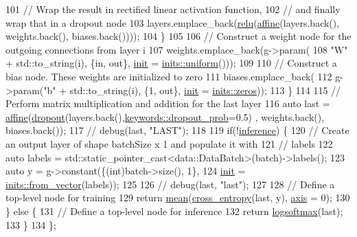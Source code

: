 \begin{DoxyCode}
101         \textcolor{comment}{// Wrap the result in rectified linear activation function,}
102         \textcolor{comment}{// and finally wrap that in a dropout node}
103         layers.emplace\_back(\hyperlink{namespacemarian_a6228f7e46aeed337e3886df6446b7840}{relu}(\hyperlink{namespacemarian_aefe65d738dc9a0536f3a1f9346b8d47b}{affine}(layers.back(), weights.back(), biases.back())));
104       \}
105 
106       \textcolor{comment}{// Construct a weight node for the outgoing connections from layer i}
107       weights.emplace\_back(g->param(
108           \textcolor{stringliteral}{"W"} + std::to\_string(i), \{in, out\}, \hyperlink{amunmt_8cpp_a2e8ddb8bd2f3405f554c9f2c52277f4b}{init} = \hyperlink{namespacemarian_1_1inits_a835dcbebcc1ee135e5637b2225eaf9d1}{inits::uniform}()));
109 
110       \textcolor{comment}{// Construct a bias node. These weights are initialized to zero}
111       biases.emplace\_back(
112           g->param(\textcolor{stringliteral}{"b"} + std::to\_string(i), \{1, out\}, \hyperlink{amunmt_8cpp_a2e8ddb8bd2f3405f554c9f2c52277f4b}{init} = \hyperlink{namespacemarian_1_1inits_a1bd34fd256e3df7bb1e27955a7f2b359}{inits::zeros}));
113     \}
114 
115     \textcolor{comment}{// Perform matrix multiplication and addition for the last layer}
116     \textcolor{keyword}{auto} last = \hyperlink{namespacemarian_aefe65d738dc9a0536f3a1f9346b8d47b}{affine}(\hyperlink{namespacemarian_a268400392f22176821c7c4a36733b178}{dropout}(layers.back(),\hyperlink{namespacemarian_1_1keywords_aeb1a41f81a79487b23aa2f8769a205bf}{keywords::dropout\_prob}=0.5)
      , weights.back(), biases.back());
117     \textcolor{comment}{// debug(last, "LAST");}
118 
119     \textcolor{keywordflow}{if}(!\hyperlink{namespacemarian_1_1keywords_a7164ab5ae8f1206943787d0891d89735}{inference}) \{
120       \textcolor{comment}{// Create an output layer of shape batchSize x 1 and populate it with}
121       \textcolor{comment}{// labels}
122       \textcolor{keyword}{auto} labels = std::static\_pointer\_cast<data::DataBatch>(batch)->labels();
123       \textcolor{keyword}{auto} y = g->constant(\{(int)batch->size(), 1\},
124                            \hyperlink{amunmt_8cpp_a2e8ddb8bd2f3405f554c9f2c52277f4b}{init} = \hyperlink{namespacemarian_1_1inits_ab9566318ddbacd376c74cdbdfac091e4}{inits::from\_vector}(labels));
125 
126       \textcolor{comment}{// debug(last, "last");}
127 
128       \textcolor{comment}{// Define a top-level node for training}
129       \textcolor{keywordflow}{return} \hyperlink{namespacemarian_a15ec9743709e47180378db974ddbf116}{mean}(\hyperlink{namespacemarian_a37652ca2a00f3c36816fe5fec28104a0}{cross\_entropy}(last, y), \hyperlink{namespacemarian_1_1keywords_ace9158eabbddaca833133f12da98b9d6}{axis} = 0);
130     \} \textcolor{keywordflow}{else} \{
131       \textcolor{comment}{// Define a top-level node for inference}
132       \textcolor{keywordflow}{return} \hyperlink{namespacemarian_a471a2cbd15b4094528a1643abc814bb6}{logsoftmax}(last);
133     \}
134   \};
\end{DoxyCode}


